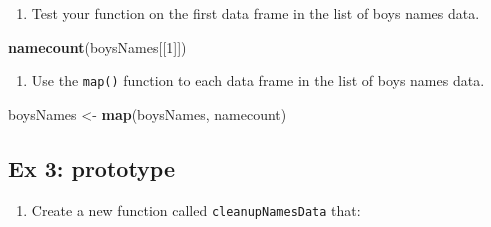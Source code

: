 \documentclass[]{book}
\newenvironment{Shaded}{\begin{snugshade}}{\end{snugshade}}
\newcommand{\KeywordTok}[1]{\textcolor[rgb]{0.13,0.29,0.53}{\textbf{#1}}}
\newcommand{\DecValTok}[1]{\textcolor[rgb]{0.00,0.00,0.81}{#1}}
\newcommand{\StringTok}[1]{\textcolor[rgb]{0.31,0.60,0.02}{#1}}
\newcommand{\NormalTok}[1]{#1}
\providecommand{\tightlist}{%
  \setlength{\itemsep}{0pt}\setlength{\parskip}{0pt}}
\begin{document}
\begin{enumerate}
\def\labelenumi{\arabic{enumi}.}
\setcounter{enumi}{1}
\tightlist
\item
  Test your function on the first data frame in the list of boys names
  data.
\end{enumerate}

\begin{Shaded}
\begin{Highlighting}[]
  \KeywordTok{namecount}\NormalTok{(boysNames[[}\DecValTok{1}\NormalTok{]])}
\end{Highlighting}
\end{Shaded}

\begin{enumerate}
\def\labelenumi{\arabic{enumi}.}
\setcounter{enumi}{2}
\tightlist
\item
  Use the \texttt{map()} function to each data frame in the list of boys
  names data.
\end{enumerate}

\begin{Shaded}
\begin{Highlighting}[]
\NormalTok{  boysNames <-}\StringTok{ }\KeywordTok{map}\NormalTok{(boysNames, namecount)}
\end{Highlighting}
\end{Shaded}

\subsection{Ex 3: prototype}\label{ex-3-prototype-3}

\begin{enumerate}
\def\labelenumi{\arabic{enumi}.}
\tightlist
\item
  Create a new function called \texttt{cleanupNamesData} that:
\end{enumerate}
\end{document}
